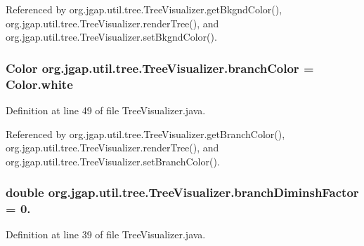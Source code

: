 Referenced by org.\-jgap.\-util.\-tree.\-Tree\-Visualizer.\-get\-Bkgnd\-Color(), org.\-jgap.\-util.\-tree.\-Tree\-Visualizer.\-render\-Tree(), and org.\-jgap.\-util.\-tree.\-Tree\-Visualizer.\-set\-Bkgnd\-Color().

\hypertarget{classorg_1_1jgap_1_1util_1_1tree_1_1_tree_visualizer_adc14970d9e51cd9ac7ec634891cdcc93}{
\subsubsection[{branch\-Color}]{\setlength{\rightskip}{0pt plus 5cm}Color org.\-jgap.\-util.\-tree.\-Tree\-Visualizer.\-branch\-Color = Color.\-white\hspace{0.3cm}{\ttfamily [private]}}}\label{classorg_1_1jgap_1_1util_1_1tree_1_1_tree_visualizer_adc14970d9e51cd9ac7ec634891cdcc93}


Definition at line 49 of file Tree\-Visualizer.\-java.



Referenced by org.\-jgap.\-util.\-tree.\-Tree\-Visualizer.\-get\-Branch\-Color(), org.\-jgap.\-util.\-tree.\-Tree\-Visualizer.\-render\-Tree(), and org.\-jgap.\-util.\-tree.\-Tree\-Visualizer.\-set\-Branch\-Color().

\hypertarget{classorg_1_1jgap_1_1util_1_1tree_1_1_tree_visualizer_a6022c22665671a626286f6b837759679}{
\subsubsection[{branch\-Diminsh\-Factor}]{\setlength{\rightskip}{0pt plus 5cm}double org.\-jgap.\-util.\-tree.\-Tree\-Visualizer.\-branch\-Diminsh\-Factor = 0.\hspace{0.3cm}{\ttfamily [private]}}}\label{classorg_1_1jgap_1_1util_1_1tree_1_1_tree_visualizer_a6022c22665671a626286f6b837759679}


Definition at line 39 of file Tree\-Visualizer.\-java.



